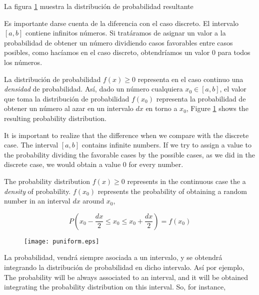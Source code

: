 \begin{paracol}{2}
La figura \ref{fig:puniform} muestra la distribución de probabilidad resultante

Es importante darse cuenta de la diferencia con el caso discreto. El intervalo $[a,b]$ contiene infinitos números. Si tratáramos de asignar un valor a la probabilidad de obtener un número dividiendo casos favorables entre casos posibles, como hacíamos en el caso discreto, obtendríamos un valor $0$ para todos los números. 

La distribución de probabilidad $f(x)\geqslant 0$ representa en el caso continuo una \emph{densidad} de probabilidad. Así, dado un número cualquiera $x_0 \in [a,b]$, el valor que toma la distribución de probabilidad $f(x_0)$ representa la probabilidad de obtener un número al azar en un intervalo $dx$ en torno a $x_0$,
\switchcolumn
Figure \ref{fig:puniform} shows the resulting probability distribution. 

It is important to realize that the difference when we compare with the discrete case. The interval $[a,b]$ contains infinite numbers. If we try to assign a value to the probability dividing the favorable cases by the possible cases, as we did in the discrete case,  we would obtain a value $0$ for every number.

The probability distribution  $f(x)\geqslant 0$ represents in the continuous case the a \emph{density} of probability. $f(x_0)$ represents the probability of obtaining a random number in an interval $dx$ around $x_0$,
\end{paracol}

\begin{equation*}
P\left(x_0-\frac{dx}{2}\leqslant x_0 \leqslant x_0+\frac{dx}{2}\right) = f(x_0)
\end{equation*} 
\begin{figure}
	\centering
	\texttt{[image: puniform.eps]}
	\label{fig:puniform}
\end{figure}
\begin{paracol}{2}
La probabilidad, vendrá siempre asociada a un intervalo, y se obtendrá integrando la distribución de probabilidad en dicho intervalo. Así por ejemplo,
\switchcolumn
The probability will be always associated to an interval, and it will be obtained integrating the probability distribution on this interval. So, for instance, 
\end{paracol}

